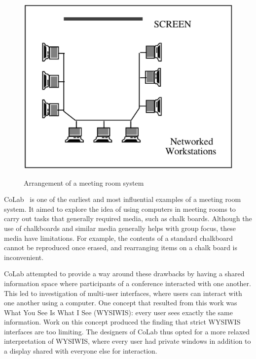 \begin{figure}[htp]
  \caption{Arrangement of a meeting room system\cite{journals/iwc/Rodden91}}
  \centering
  \includegraphics[scale=.5]{meeting_room_sys.eps}
  \label{meeting_room_fig}
\end{figure}



CoLab~\cite{Stefik:1987:BCU} is one of the earliest and most
influential examples of a meeting room system. It aimed to explore the
idea of using computers in meeting rooms to carry out tasks that
generally required media, such as chalk boards. Although the use of
chalkboards and similar media generally helps with group focus, these
media have limitations.  For example, the contents of a standard
chalkboard cannot be reproduced once erased, and rearranging items on
a chalk board is inconvenient.

CoLab attempted to provide a way around these drawbacks by having a
shared information space where participants of a conference interacted
with one another. This led to investigation of multi-user interfaces,
where users can interact with one another using a computer.  One
concept that resulted from this work was What You See Is What I See
(WYSIWIS): every user sees exactly the same information.  Work on this
concept produced the finding that strict WYSIWIS interfaces are too
limiting.  The designers of CoLab thus opted for a more relaxed
interpretation of WYSIWIS, where every user had private windows in
addition to a display shared with everyone else for interaction.

